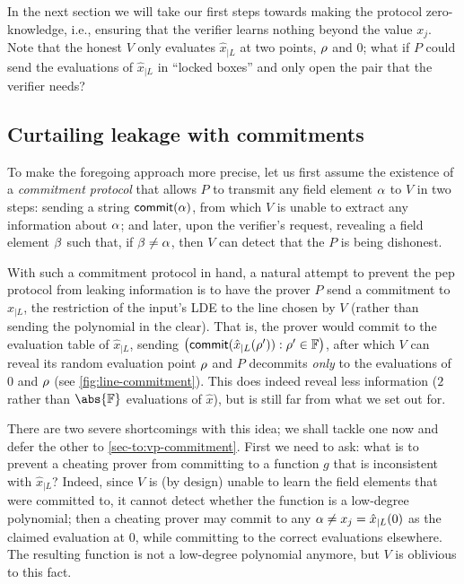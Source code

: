 \documentclass[a4paper,UKenglish,cleveref, autoref, thm-restate]{lipics-v2021}
\theoremstyle{definition}
\newcommand{\field}{\mathbb{F}}
\newcommand{\pepprotocol}{\textsf{pep}\xspace}
\renewcommand{\line}{L}
\def\fe#1{
    \ifnum#1=1
        \alpha
    \else
    \ifnum#1=2
        \beta
    \else
    \ifnum#1=3
        \gamma
    \fi\fi\fi
}
\def\rfe#1{
    \ifnum#1=1
        \rho
    \else
    \ifnum#1=2
        \sigma
    \else
    \fi\fi
}
\begin{document}
     In the next section we will take our first steps towards making the protocol zero-knowledge, i.e., ensuring that the verifier learns nothing beyond the value $x_j$.
     Note that the honest $V$ only evaluates $\hat x_{|\line}$ at two points, $\rfe1$ and $0$; what if $P$ could send the evaluations of $\hat x_{|\line}$ in ``locked boxes'' and only open the pair that the verifier needs?

\subsection{Curtailing leakage with commitments}
\label{sec-to:pv-commitment}

    To make the foregoing approach more precise, let us first assume the existence of a \emph{commitment protocol} that allows $P$ to transmit any field element $\fe1$ to $V$ in two steps: sending a string $\textsf{commit}(\fe1)$, from which $V$ is unable to extract any information about $\fe1$; and later, upon the verifier's request, revealing a field element $\fe2$ such that, if $\fe2 \neq \fe1$, then $V$ can detect that the $P$ is being dishonest.
    
    With such a commitment protocol in hand, a natural attempt to prevent the \pepprotocol protocol from leaking information is to have the prover $P$ send a commitment to $\hat x_{|\line}$, the restriction of the input's LDE to the line chosen by $V$ (rather than sending the polynomial in the clear). That is, the prover would commit to the evaluation table of $\hat x_{|\line}$, sending $\big(\textsf{commit}(\hat x_{|\line}(\rfe1')) : \rfe1' \in \field\big)$, after which $V$ can reveal its random evaluation point $\rfe1$ and $P$ decommits \emph{only} to the evaluations of $0$ and $\rfe1$  (see \cref{fig:line-commitment}). This does indeed reveal less information ($2$ rather than $\abs{\field}$ evaluations of $\hat x$), but is still far from what we set out for.
    
    There are two severe shortcomings with this idea; we shall tackle one now and defer the other to \cref{sec-to:vp-commitment}. First we need to ask: what is to prevent a cheating prover from committing to a function $g$ that is inconsistent with $\hat x_{|\line}$? 
    Indeed, since $V$ is (by design) unable to learn the field elements that were committed to, it cannot detect whether the function is a low-degree polynomial; then a cheating prover may commit to any $\fe1 \neq x_j = \hat x_{|\line}(0)$ as the claimed evaluation at $0$, while committing to the correct evaluations elsewhere. The resulting function is not a low-degree polynomial anymore, but $V$ is oblivious to this fact.
\end{document}
